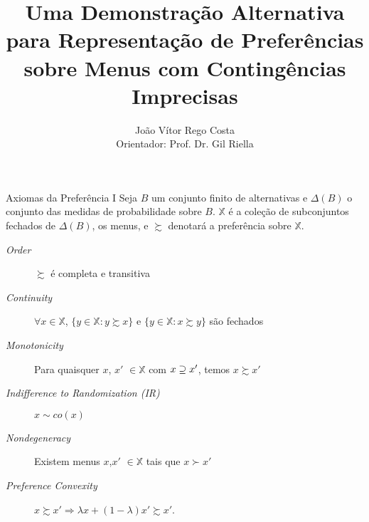 \documentclass[11pt]{beamer}
\author[João Vítor Rego Costa]{João Vítor Rego Costa \\ Orientador: Prof. Dr. Gil Riella}
\title[Menus com Contingências Imprecisas]{Uma Demonstração Alternativa para
Representação de Preferências sobre Menus com
Contingências Imprecisas}
\theoremstyle{nonumberplain}
\theoremstyle{plain}
\begin{document}
\begin{frame}
\titlepage
\end{frame}

\begin{frame}{Axiomas da Preferência I}
Seja $B$ um conjunto finito de alternativas e $\Delta(B)$ o conjunto das medidas de probabilidade sobre $B$. $\mathbb{X}$ é a coleção de subconjuntos fechados de $\Delta(B)$, os menus, e $\succsim$ denotará a preferência sobre $\mathbb{X}$.

\vspace{12pt}

\begin{description}
\item [\textit{Order}] $\succsim$ é completa e transitiva
\item [\textit{Continuity}] $\forall x\in \mathbb{X}$, $\{y\in \mathbb{X}:y\succsim x\}$ e $\{y\in \mathbb{X}:x\succsim y\}$ são fechados

\item [\textit{Monotonicity}] Para quaisquer $x$, $x'$ $\in\mathbb{X}$ com $x\begin{small}\supseteq\end{small} x'$, temos $x\succsim x'$

\item [\textit{Indifference to Randomization (IR)}] $x\sim co(x)$

\item [\textit{Nondegeneracy}] Existem menus $x$,$x'$ $\in \mathbb{X}$ tais que $x\succ x'$

\item [\textit{Preference Convexity}] $x\succsim x' \Rightarrow \lambda x +(1-\lambda)x'\succsim x'$.
\end{description}
\end{frame}
\end{document}
